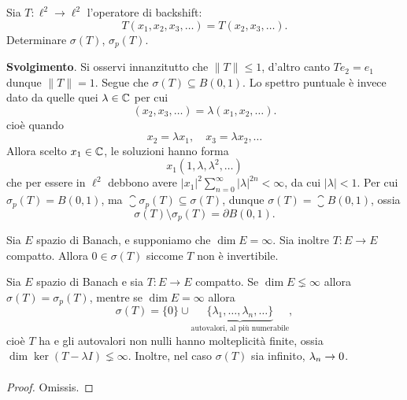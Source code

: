 \begin{exercise}
	Sia $T: \ell^2 \to \ell^2$ l'operatore di backshift:
	\begin{equation*}
		T(x_1, x_2, x_3, \ldots) = T(x_2, x_3, \ldots).
	\end{equation*}
	Determinare $\sigma(T)$, $\sigma_p(T)$.

	\textbf{Svolgimento}.
	Si osservi innanzitutto che $\|T\| \leq 1$, d'altro canto $Te_2 = e_1$ dunque $\|T\| = 1$. Segue che $\sigma(T) \subseteq B(0,1)$. Lo spettro puntuale è invece dato da quelle quei $\lambda \in \mathbb{C}$ per cui
	\begin{equation*}
		(x_2, x_3, \ldots) = \lambda (x_1, x_2, \ldots).
	\end{equation*}
	cioè quando
	\begin{equation*}
		x_2 = \lambda x_1, \quad x_3 = \lambda x_2, \ldots
	\end{equation*}
	Allora scelto $x_1 \in \mathbb{C}$, le soluzioni hanno forma
	\begin{equation*}
		x_1 (1, \lambda, \lambda^2, \ldots)
	\end{equation*}
	che per essere in $\ell^2$ debbono avere $|x_1|^2\sum_{n=0}^\infty |\lambda|^{2n} < \infty$, da cui $|\lambda| < 1$. Per cui $\sigma_p(T) = B(0,1)$, ma $\closure{\sigma_p(T)} \subseteq \sigma(T)$, dunque $\sigma(T) = \closure B(0,1)$, ossia
	\begin{equation*}
		\sigma(T) \setminus \sigma_p(T) = \partial B(0,1).
	\end{equation*}
\end{exercise}

\begin{remark}
	Sia $E$ spazio di Banach, e supponiamo che $\dim E = \infty$. Sia inoltre $T:E \to E$ compatto. Allora $0 \in \sigma(T)$ siccome $T$ non è invertibile.
\end{remark}

\begin{theorem}
\label{th:riesz_schauder}
	Sia $E$ spazio di Banach e sia $T:E \to E$ compatto.
	Se $\dim E \lneq \infty$ allora $\sigma(T) = \sigma_p(T)$, mentre se $\dim E = \infty$ allora
	\begin{equation*}
		\sigma(T) = \{0\} \cup \underbrace{\{\lambda_1, \ldots, \lambda_n, \ldots\}}_{\text{autovalori, al più numerabile}},
	\end{equation*}
	cioè $T$ ha  e gli autovalori non nulli hanno molteplicità finite, ossia $\dim \ker(T-\lambda I) \lneq \infty$.
	Inoltre, nel caso $\sigma(T)$ sia infinito, $\lambda_n \underset{{}}{\rightarrow} 0$.
\end{theorem}
\begin{proof}
	Omissis.
\end{proof}

